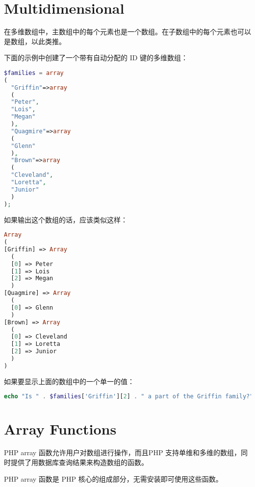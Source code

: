 \section{Multidimensional}



在多维数组中，主数组中的每个元素也是一个数组。在子数组中的每个元素也可以是数组，以此类推。


下面的示例中创建了一个带有自动分配的 ID 键的多维数组：


\begin{lstlisting}[language=PHP]
$families = array
(
  "Griffin"=>array
  (
  "Peter",
  "Lois",
  "Megan"
  ),
  "Quagmire"=>array
  (
  "Glenn"
  ),
  "Brown"=>array
  (
  "Cleveland",
  "Loretta",
  "Junior"
  )
);
\end{lstlisting}

如果输出这个数组的话，应该类似这样：


\begin{lstlisting}[language=PHP]
Array
(
[Griffin] => Array
  (
  [0] => Peter
  [1] => Lois
  [2] => Megan
  )
[Quagmire] => Array
  (
  [0] => Glenn
  )
[Brown] => Array
  (
  [0] => Cleveland
  [1] => Loretta
  [2] => Junior
  )
)
\end{lstlisting}

如果要显示上面的数组中的一个单一的值：


\begin{lstlisting}[language=PHP]
echo "Is " . $families['Griffin'][2] . " a part of the Griffin family?"; 
\end{lstlisting}





\section{Array Functions}


PHP array 函数允许用户对数组进行操作，而且PHP 支持单维和多维的数组，同时提供了用数据库查询结果来构造数组的函数。

PHP array 函数是 PHP 核心的组成部分，无需安装即可使用这些函数。



